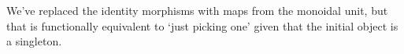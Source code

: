 We've replaced the identity morphisms with maps from the monoidal unit, but that is functionally equivalent to `just picking one' given that the initial object is a singleton.
